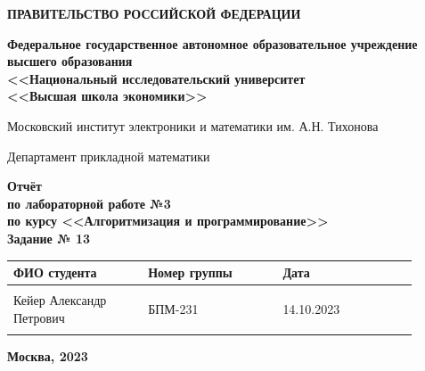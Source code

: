 \documentclass[12pt]{article}
\begin{document}
	
	\thispagestyle{empty}
	\begin{center}
		\textbf{ПРАВИТЕЛЬСТВО РОССИЙСКОЙ ФЕДЕРАЦИИ}
		
		\vspace{5ex}
		
		\textbf{Федеральное государственное автономное образовательное учреждение \\ высшего образования \\ <<Национальный исследовательский университет \\ <<Высшая школа экономики>>}
	\end{center}
	\vspace{5ex}
	
	\begin{center}
		Московский институт электроники и математики им. А.Н. Тихонова  
		
		\vspace{5ex}
		
		Департамент прикладной математики
		
		\vspace{10ex}
		\textbf{Отчёт \\ по лабораторной работе №3 \\ по курсу <<Алгоритмизация и программирование>> \\ Задание № 13}
		\vspace{7ex}
		
	\end{center}
	
	\begin{center} 
		\begin{tabular}{| p{0.3\linewidth}| p{0.3\linewidth}| p{0.3\linewidth}|}
			\hline	
			ФИО студента & Номер группы & Дата \\  \hline
			& & \\  
			Кейер Александр \newline Петрович & БПМ-231 & 14.10.2023\\  
			& & \\  \hline		
		\end{tabular}
	\end{center}
	
	\begin{center}
		\vspace{3ex}
		
		\vfill
		
		\normalsize
		
		\textbf{Москва, 2023}
	\end{center}
	
\end{document}
